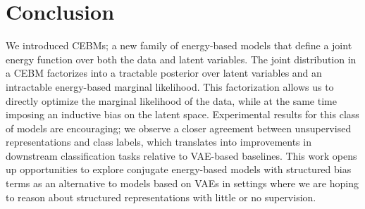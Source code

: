 \documentclass{article}
\begin{document}
\vspace*{-0.5ex}
\section{Conclusion}
\label{sec:conclusion}
\vspace*{-0.5ex}

We introduced CEBMs; a new family of energy-based models that define a joint energy function over both the data and latent variables. The joint distribution in a CEBM factorizes into a tractable posterior over latent variables and an intractable energy-based marginal likelihood. This factorization allows us to directly optimize the marginal likelihood of the data, while at the same time imposing an inductive bias on the latent space. Experimental results for this class of models are encouraging; we observe 
a closer agreement between unsupervised representations and class labels, which translates into improvements in downstream classification tasks relative to VAE-based baselines. This work opens up opportunities to explore conjugate energy-based models with structured bias terms as an alternative to models based on VAEs in settings where we are hoping to reason about structured representations with little or no supervision. 







\appendix


\end{document}
